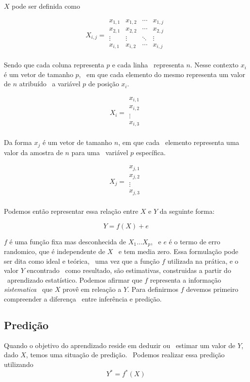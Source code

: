 $X$ pode ser definida como

\[
X_{i,j} = \begin{matrix}
x_{1,1} & x_{1,2} & \cdots & x_{1,j} \\
x_{2,1} & x_{2,2} & \cdots & x_{2,j} \\
\vdots  & \vdots  & \ddots & \vdots  \\
x_{i,1} & x_{i,2} & \cdots & x_{i,j} \\
\end{matrix}
\]

Sendo que cada coluna representa $p$ e cada linha \
representa $n$. Nesse contexto $x_i$ é um vetor de tamanho $p$, \
em que cada elemento do mesmo representa um valor de $n$ atribuído \
a variável $p$ de posição $x_i$.

\[
X_{i} = \begin{matrix}
x_{i,1} \\
x_{i,2} \\
\vdots  \\
x_{i,3} \\
\end{matrix}
\]

Da  forma $x_j$ é um vetor de tamanho $n$, em que cada \
elemento representa uma valor da amostra de $n$ para uma \
variável $p$ específica.

\[
X_{j} = \begin{matrix}
x_{j,1} \\
x_{j,2} \\
\vdots  \\
x_{j,3} \\
\end{matrix}
\]

Podemos então representar essa relação entre $X$ e $Y$ da seguinte forma:

\[
  Y = f(X) + e
\]

$f$ é uma função fixa mas desconhecida de $X_1...X_p$, \
e $e$ é o termo de erro randomico, que é independente de $X$ \
e tem media zero. Essa formulação pode ser dita como ideal e teórica, \
uma vez que a função $f$ utilizada na prática, e o valor $Y$ encontrado \
como resultado, são estimativas, construidas a partir do \
aprendizado estatístico.
Podemos afirmar que $f$ representa a informação \textit{sistematica} \
que $X$ provê em releação a $Y$\cite{Jordan}.
Para definirmos $f$ devemos primeiro compreender a diferença \
entre inferência e predição.

\subsection{Predição}
Quando o objetivo do aprendizado reside em deduzir ou \
estimar um valor de $Y$, dado $X$, temos uma situação de predição. \
Podemos realizar essa predição utilizando
\[
  Y^* = f^*(X)
\]

